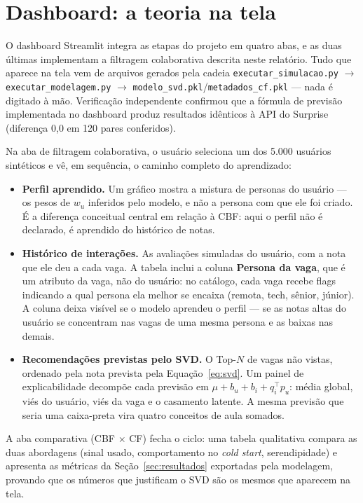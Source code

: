 \documentclass[12pt,a4paper]{article}
\begin{document}
\section{Dashboard: a teoria na tela}\label{sec:dashboard}

O dashboard Streamlit integra as etapas do projeto em quatro abas, e as duas últimas implementam a filtragem colaborativa descrita neste relatório. Tudo que aparece na tela vem de arquivos gerados pela cadeia \texttt{executar\_simulacao.py} $\rightarrow$ \texttt{executar\_modelagem.py} $\rightarrow$ \texttt{modelo\_svd.pkl}/\texttt{metadados\_cf.pkl} --- nada é digitado à mão. Verificação independente confirmou que a fórmula de previsão implementada no dashboard produz resultados idênticos à API do Surprise (diferença 0,0 em 120 pares conferidos).

Na aba de filtragem colaborativa, o usuário seleciona um dos 5.000 usuários sintéticos e vê, em sequência, o caminho completo do aprendizado:

\begin{itemize}
    \item \textbf{Perfil aprendido.} Um gráfico mostra a mistura de personas do usuário --- os pesos de $w_u$ inferidos pelo modelo, e não a persona com que ele foi criado. É a diferença conceitual central em relação à CBF: aqui o perfil não é declarado, é aprendido do histórico de notas.
    \item \textbf{Histórico de interações.} As avaliações simuladas do usuário, com a nota que ele deu a cada vaga. A tabela inclui a coluna \textbf{Persona da vaga}, que é um atributo da vaga, não do usuário: no catálogo, cada vaga recebe flags indicando a qual persona ela melhor se encaixa (remota, tech, sênior, júnior). A coluna deixa visível se o modelo aprendeu o perfil --- se as notas altas do usuário se concentram nas vagas de uma mesma persona e as baixas nas demais.
    \item \textbf{Recomendações previstas pelo SVD.} O Top-$N$ de vagas não vistas, ordenado pela nota prevista pela Equação~\eqref{eq:svd}. Um painel de explicabilidade decompõe cada previsão em $\mu + b_u + b_i + q_i^{\top} p_u$: média global, viés do usuário, viés da vaga e o casamento latente. A mesma previsão que seria uma caixa-preta vira quatro conceitos de aula somados.
\end{itemize}

A aba comparativa (CBF $\times$ CF) fecha o ciclo: uma tabela qualitativa compara as duas abordagens (sinal usado, comportamento no \textit{cold start}, serendipidade) e apresenta as métricas da Seção~\ref{sec:resultados} exportadas pela modelagem, provando que os números que justificam o SVD são os mesmos que aparecem na tela.
\end{document}
